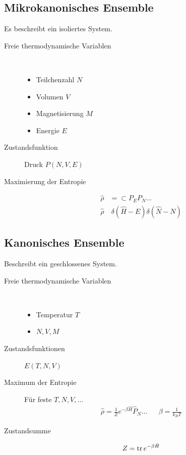 \subsection*{Mikrokanonisches Ensemble}
Es beschreibt ein isoliertes System.
\begin{description}
  \item[Freie thermodynamische Variablen] $ $ 
    \begin{itemize}
      \item Teilchenzahl $N$
      \item Volumen $V$
      \item Magnetisierung $M$
      \item Energie $E$
    \end{itemize}
  \item[Zustandsfunktion] Druck $P(N,V,E)$
  \item[Maximierung der Entropie] 
    \begin{align*}
      \hat{\rho} & = \subset P_E P_N \ldots \\
      \hat{\rho} & ~ \delta(\hat{H} - E) \delta (\hat{N} - N)
    \end{align*}
\end{description}
\subsection*{Kanonisches Ensemble}
Beschreibt ein geschlossenes System.
\begin{description}
  \item[Freie thermodynamische Variablen] $ $
    \begin{itemize}
      \item Temperatur $T$
      \item $N, V, M$
    \end{itemize}
  \item[Zustandsfunktionen] $E(T, N, V)$
  \item [Maximum der Entropie] 
    F\"ur feste $T, N, V, \ldots$
    \begin{align*}
      \hat{\rho} = \frac{1}{Z} e^{- \beta \hat{H} } \hat{P}_N \ldots && 
      \beta = \frac{1}{k_B T}
    \end{align*}
  \item[Zustandsumme]
    \begin{align*}
      Z= \operatorname{tr} e^{- \beta \hat{H}}
    \end{align*}
\end{description}

